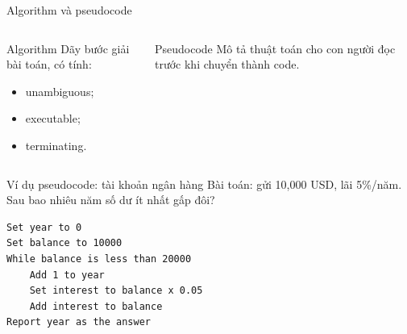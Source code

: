 \documentclass[aspectratio=169,10pt]{beamer}
\begin{document}
\begin{frame}{Algorithm và pseudocode}
\begin{columns}[T]
\begin{block}{Algorithm}
Dãy bước giải bài toán, có tính:
\begin{itemize}
  \item unambiguous;
  \item executable;
  \item terminating.
\end{itemize}
\end{block}
\begin{block}{Pseudocode}
Mô tả thuật toán cho con người đọc trước khi chuyển thành code.
\end{block}

\begin{center}
\end{center}
\end{columns}
\end{frame}

\begin{frame}[fragile]{Ví dụ pseudocode: tài khoản ngân hàng}
Bài toán: gửi 10,000 USD, lãi 5\%/năm. Sau bao nhiêu năm số dư ít nhất gấp đôi?

\begin{lstlisting}[language={}]
Set year to 0
Set balance to 10000
While balance is less than 20000
    Add 1 to year
    Set interest to balance x 0.05
    Add interest to balance
Report year as the answer
\end{lstlisting}
\end{frame}
\end{document}
